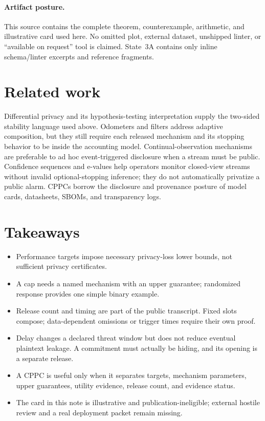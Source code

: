 \documentclass[11pt]{article}
\begin{document}
\paragraph{Artifact posture.}
This source contains the complete theorem, counterexample, arithmetic, and illustrative card used here.
No omitted plot, external dataset, unshipped linter, or ``available on request'' tool is claimed.
State~3A contains only inline schema/linter excerpts and reference fragments.\cite{series:state3addendum}

\section{Related work}

Differential privacy and its hypothesis-testing interpretation supply the two-sided stability language used above.\cite{dworkroth2014foundations,balle2020rdp_testing,nist_sp800_226}
Odometers and filters address adaptive composition, but they still require each released mechanism and its stopping behavior to be inside the accounting model.\cite{rogers2016odometers,lecuuyer2021practical}
Continual-observation mechanisms are preferable to ad hoc event-triggered disclosure when a stream must be public.\cite{dwork2010continual,chan2010continual,jain2023priceContinual,cohen2024continual_lowerbounds}
Confidence sequences and e-values help operators monitor closed-view streams without invalid optional-stopping inference; they do not automatically privatize a public alarm.\cite{howard2021confseq,ramdas2024evalues,wang2022ebh}
CPPCs borrow the disclosure and provenance posture of model cards, datasheets, SBOMs, and transparency logs.\cite{mitchell2019modelcards,gebru2021datasheets,spdx_overview,rfc9162_ct}

\section{Takeaways}
\begin{itemize}[leftmargin=*]
\item Performance targets impose necessary privacy-loss lower bounds, not sufficient privacy certificates.
\item A cap needs a named mechanism with an upper guarantee; randomized response provides one simple binary example.
\item Release count and timing are part of the public transcript.  Fixed slots compose; data-dependent omissions or trigger times require their own proof.
\item Delay changes a declared threat window but does not reduce eventual plaintext leakage.  A commitment must actually be hiding, and its opening is a separate release.
\item A CPPC is useful only when it separates targets, mechanism parameters, upper guarantees, utility evidence, release count, and evidence status.
\item The card in this note is illustrative and publication-ineligible; external hostile review and a real deployment packet remain missing.
\end{itemize}
\end{document}
